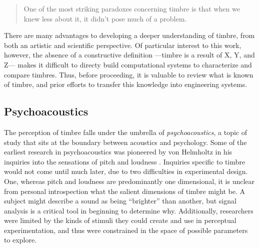 \begin{quote}
One of the most striking paradoxes concerning timbre is that when we knew less about it, it didn’t pose much of a problem.
\end{quote}

There are many advantages to developing a deeper understanding of timbre, from both an artistic and scientific perspective.
Of particular interest to this work, however, the absence of a constructive definition ---timbre is a result of X, Y, and Z--- makes it difficult to directy build computational systems to characterize and compare timbres.
Thus, before proceeding, it is valuable to review what is known of timbre, and prior efforts to transfer this knowledge into engineering systems.


\subsection{Psychoacoustics}
The perception of timbre falls under the umbrella of \emph{psychoacoustics}, a topic of study that sits at the boundary between acoustics and psychology.
Some of the earliest research in psychoacoustics was pioneered by von Helmholtz in his inquiries into the sensations of pitch and loudness \cite{Cook1995?}.
Inquiries specific to timbre would not come until much later, due to two difficulties in experimental design.
One, whereas pitch and loudness are predominantly one dimensional, it is unclear from personal introspection what the salient dimensions of timbre might be.
A subject might describe a sound as being ``brighter'' than another, but signal analysis is a critical tool in beginning to determine why.
Additionally, researchers were limited by the kinds of stimuli they could create and use in perceptual experimentation, and thus were constrained in the space of possible parameters to explore.

